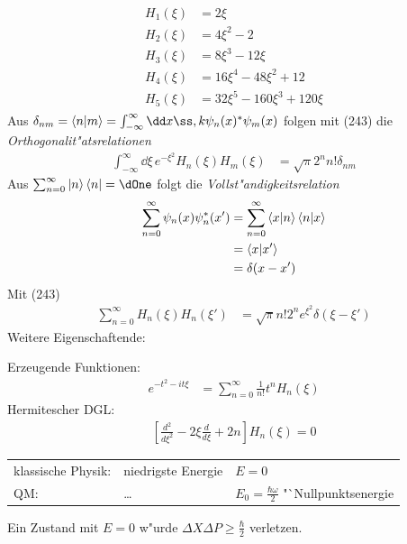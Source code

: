 \documentclass[a4paper]{scrartcl}
\begin{document}
{\begin{align}
\begin{split}
H_1(\xi) & = 2 \xi \\
H_2(\xi) & = 4 \xi^2 - 2 \\
H_3(\xi) & = 8 \xi^3 - 12 \xi \\
H_4(\xi) & = 16 \xi^4 - 48 \xi^2 + 12 \\
H_5(\xi) & = 32 \xi^5 - 160 \xi^3 + 120 \xi
\end{split}
\end{align}
Aus $\delta_{nm} = \braket{n | m} = \int_{-\infty}^\infty \dd x ß,k \psi_n(x)^* \psi_m(x)$ folgen mit (243) die \emph{Orthogonalit"atsrelationen}
\begin{align}
\int_{-\infty}^\infty \dd \xi \, e^{-\xi^2} H_n(\xi) H_m(\xi) & =  \sqrt \pi 2^n n! \delta_{nm}
\end{align}
Aus $\sum_{n=0}^\infty \ket n \bra n = \dOne$ folgt die \emph{Vollst"andigkeitsrelation}
\begin{align}
\begin{split}
\sum_{n=0}^\infty \psi_n(x) \psi_n^*(x') & = \sum_{n=0}^\infty \braket{ x | n } \braket{ n | x} \\
& = \braket{ x | x'} \\
& = \delta(x - x')
\end{split}
\end{align}
Mit (243)
\begin{align}
\sum_{n=0}^\infty H_n(\xi) H_n(\xi') & = \sqrt \pi n! 2^n e^{\xi^2} \delta( \xi - \xi')
\end{align}
Weitere Eigenschaftende:

Erzeugende Funktionen:
\begin{align}
e^{-t^2 - it \xi} & = \sum_{n=0}^\infty \frac 1{n!} t^n H_n(\xi)
\end{align}
Hermitescher DGL:
\begin{align}
\left[ \frac{d^2}{d\xi^2} - 2\xi \frac{d}{d\xi} + 2n \right] H_n(\xi) = 0
\end{align}

\begin{center}
\begin{tabular}{ l l l}
klassische Physik: & niedrigste Energie & $E = 0$ \\
QM: & \ldots & $E_0 = \frac{\hbar \omega}2$ "`Nullpunktsenergie
\end{tabular}
\end{center}
Ein Zustand mit $E=0$ w"urde $\Delta X \Delta P \geq \frac \hbar 2$ verletzen.

}
\end{document}
